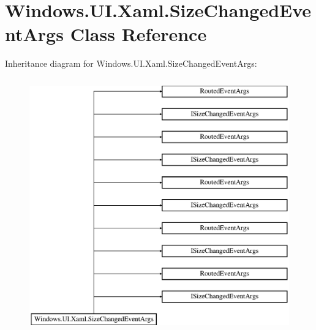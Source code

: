 \hypertarget{class_windows_1_1_u_i_1_1_xaml_1_1_size_changed_event_args}{}\section{Windows.\+U\+I.\+Xaml.\+Size\+Changed\+Event\+Args Class Reference}
\label{class_windows_1_1_u_i_1_1_xaml_1_1_size_changed_event_args}
Inheritance diagram for Windows.\+U\+I.\+Xaml.\+Size\+Changed\+Event\+Args\+:\begin{figure}[H]
\begin{center}
\leavevmode
\includegraphics[height=11.000000cm]{class_windows_1_1_u_i_1_1_xaml_1_1_size_changed_event_args}
\end{center}
\end{figure}
